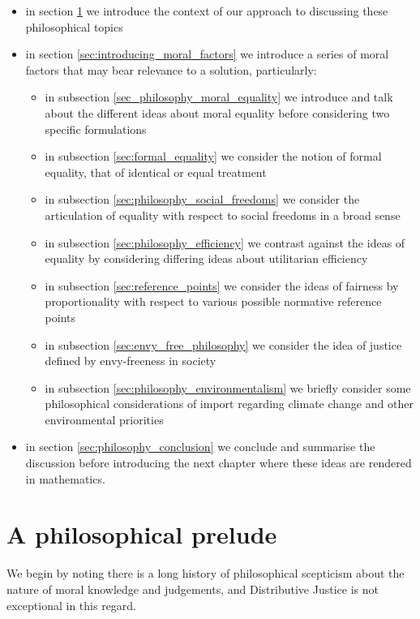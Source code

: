 \begin{itemize}
\item	in section \ref{sec:philosophical_prelude} we introduce the context of our approach to discussing these philosophical topics
\item	in section \ref{sec:introducing_moral_factors} we introduce a series of moral factors that may bear relevance to a solution, particularly:
\begin{itemize}
\item	in subsection \ref{sec_philosophy_moral_equality} we introduce and talk about the different ideas about moral equality before considering two specific formulations
\item	in subsection \ref{sec:formal_equality} we consider the notion of formal equality, that of identical or equal treatment
\item	in subsection \ref{sec:philosophy_social_freedoms} we consider the articulation of equality with respect to social freedoms in a broad sense
\item	in subsection \ref{sec:philosophy_efficiency} we contrast against the ideas of equality by considering differing ideas about utilitarian efficiency
\item	in subsection \ref{sec:reference_points} we consider the ideas of fairness by proportionality with respect to various possible normative reference points
\item	in subsection \ref{sec:envy_free_philosophy} we consider the idea of justice defined by envy-freeness in society
\item	in subsection \ref{sec:philosophy_environmentalism} we briefly consider some philosophical considerations of import regarding climate change and other environmental priorities
\end{itemize}
\item	in section \ref{sec:philosophy_conclusion} we conclude and summarise the discussion before introducing the next chapter where these ideas are rendered in mathematics.
\end{itemize}

\section{A philosophical prelude}\label{sec:philosophical_prelude}

We begin by noting there is a long history of philosophical scepticism about the nature of moral knowledge and judgements, and Distributive Justice is not exceptional in this regard.

